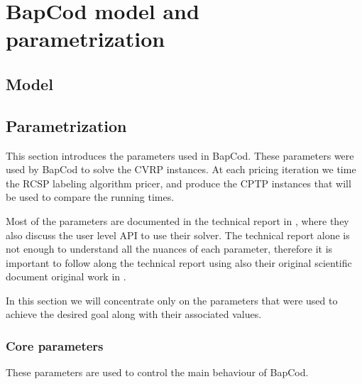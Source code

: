 \chapter{BapCod model and parametrization}


\section{Model}




\section{Parametrization}

This section introduces the parameters used in BapCod.
These parameters were used by BapCod to solve the CVRP instances.
At each pricing iteration we time the RCSP labeling algorithm pricer, and produce the CPTP instances that will be used to compare the running times.


Most of the parameters are documented in the technical report in \cite{sadykov2021bapcod}, where they also discuss the user level API to use their solver.
The technical report alone is not enough to understand all the nuances of each parameter, therefore it is important to follow along the technical report using also their original scientific document original work in \cite{pessoa2020generic}.

In this section we will concentrate only on the parameters that were used to achieve the desired goal along with their associated values.

\subsection{Core parameters}

These parameters are used to control the main behaviour of BapCod.

